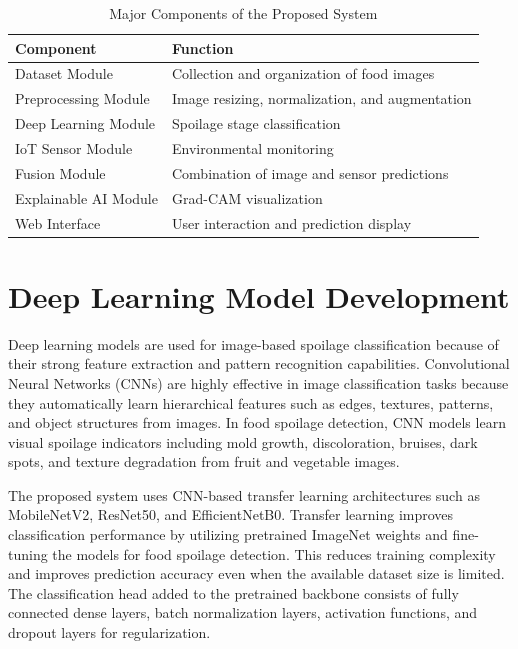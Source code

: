 \begin{table}[H]
	\centering
	\caption{Major Components of the Proposed System}
	\label{tab:major_components}
	\begin{tabular}{|l|l|}
		\hline
		\textbf{Component} & \textbf{Function} \\ \hline
		Dataset Module & Collection and organization of food images \\ \hline
		Preprocessing Module & Image resizing, normalization, and augmentation \\ \hline
		Deep Learning Module & Spoilage stage classification \\ \hline
		IoT Sensor Module & Environmental monitoring \\ \hline
		Fusion Module & Combination of image and sensor predictions \\ \hline
		Explainable AI Module & Grad-CAM visualization \\ \hline
		Web Interface & User interaction and prediction display \\ \hline
	\end{tabular}
\end{table}

\section[Deep Learning Model Development]{\textbf{Deep Learning Model Development}}
Deep learning models are used for image-based spoilage classification because of their strong feature extraction and pattern recognition capabilities. Convolutional Neural Networks (CNNs) are highly effective in image classification tasks because they automatically learn hierarchical features such as edges, textures, patterns, and object structures from images. In food spoilage detection, CNN models learn visual spoilage indicators including mold growth, discoloration, bruises, dark spots, and texture degradation from fruit and vegetable images.

The proposed system uses CNN-based transfer learning architectures such as MobileNetV2, ResNet50, and EfficientNetB0. Transfer learning improves classification performance by utilizing pretrained ImageNet weights and fine-tuning the models for food spoilage detection. This reduces training complexity and improves prediction accuracy even when the available dataset size is limited. The classification head added to the pretrained backbone consists of fully connected dense layers, batch normalization layers, activation functions, and dropout layers for regularization.

